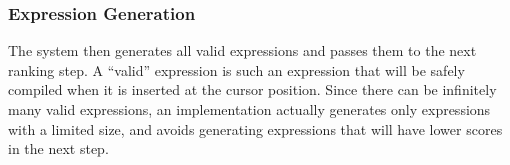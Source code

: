\documentclass[PRO,english]{ipsj}
\begin{document}


\subsubsection{Expression Generation}
The system then generates all valid expressions and passes them to the next ranking step.  A ``valid'' expression is such an expression that will be safely compiled when it is inserted at the cursor position.  Since there can be infinitely many valid expressions, an implementation actually generates only expressions with a limited size, and avoids generating expressions that will have lower scores in the next step.





\end{document}

